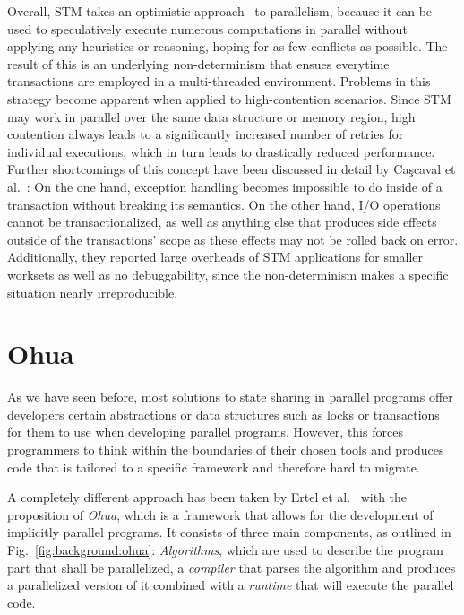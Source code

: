 Overall, STM takes an optimistic approach~\cite{kulkarni2007optimistic} to parallelism, because it can be used to speculatively execute numerous computations in parallel without applying any heuristics or reasoning, hoping for as few conflicts as possible.
The result of this is an underlying non-determinism that ensues everytime transactions are employed in a multi-threaded environment.
Problems in this strategy become apparent when applied to high-contention scenarios.
Since STM may work in parallel over the same data structure or memory region, high contention always leads to a significantly increased number of retries for individual executions, which in turn leads to drastically reduced performance.
Further shortcomings of this concept have been discussed in detail by Caşcaval et al.~\cite{cascaval2008software}:
On the one hand, exception handling becomes impossible to do inside of a transaction without breaking its semantics.
On the other hand, I/O operations cannot be transactionalized, as well as anything else that produces side effects outside of the transactions' scope as these effects may not be rolled back on error.
Additionally, they reported large overheads of STM applications for smaller worksets as well as no debuggability, since the non-determinism makes a specific situation nearly irreproducible.


\section{Ohua}
\label{sec:background:ohua}

As we have seen before, most solutions to state sharing in parallel programs offer developers certain abstractions or data structures such as locks or transactions for them to use when developing parallel programs.
However, this forces programmers to think within the boundaries of their chosen tools and produces code that is tailored to a specific framework and therefore hard to migrate.

A completely different approach has been taken by Ertel et al.~\cite{ertel2019dis} with the proposition of \emph{Ohua}, which is a framework that allows for the development of implicitly parallel programs.
It consists of three main components, as outlined in Fig.~\ref{fig:background:ohua}:
\emph{Algorithms}, which are used to describe the program part that shall be parallelized, a \emph{compiler} that parses the algorithm and produces a parallelized version of it combined with a \emph{runtime} that will execute the parallel code.

